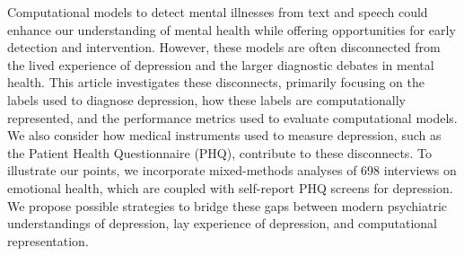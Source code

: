 Computational models to detect mental illnesses from text and speech could enhance our understanding of mental health while offering opportunities for early detection and intervention. However, these models are often disconnected from the lived experience of depression and the larger diagnostic debates in mental health. This article investigates these disconnects, primarily focusing on the labels used to diagnose depression, how these labels are computationally represented, and the performance metrics used to evaluate computational models. We also consider how medical instruments used to measure depression, such as the Patient Health Questionnaire (PHQ), contribute to these disconnects. To illustrate our points, we incorporate mixed-methods analyses of 698 interviews on emotional health, which are coupled with self-report PHQ screens for depression. We propose possible strategies to bridge these gaps between modern psychiatric understandings of depression, lay experience of depression, and computational representation.

